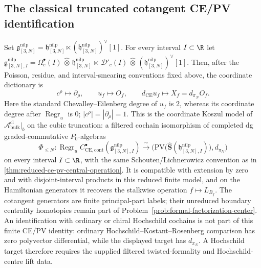 \subsection*{The classical truncated cotangent CE/PV identification}

\begin{thm}\label{thm:phi-trunc-classical}
Set
$\mathfrak g^{\mathrm{nilp}}_{[3,N]}=\mathfrak h^{\mathrm{nilp}}_{[3,N]}\ltimes
(\mathfrak h^{\mathrm{nilp}}_{[3,N]})^\vee[1]$. For every interval $I\subset\R$ let
$\mathfrak g^{\mathrm{nilp}}_{[3,N],I}=
\Omega^\bullet_c(I)\,\widehat\otimes\,\mathfrak h^{\mathrm{nilp}}_{[3,N]}\,\ltimes\,
\mathcal D'_c(I)\,\widehat\otimes\,(\mathfrak h^{\mathrm{nilp}}_{[3,N]})^\vee[1]$.
Then, after the Poisson, residue, and interval-smearing conventions fixed
above, the coordinate dictionary is
\[
  c^\rho\longmapsto\partial_\rho,
  \qquad
  u_f\longmapsto O_f,
  \qquad
  d_{\mathrm{CE}}u_f\longmapsto X_f=d_{\pi_N}O_f.
\]
Here the standard Chevalley--Eilenberg degree of \(u_f\) is \(2\),
whereas its coordinate degree after \(\operatorname{Regr}_u\) is \(0\);
\(|c^\rho|=|\partial_\rho|=1\).  This is the coordinate Koszul model of
\(\mathcal A^{\mathrm{cl}}_{\mathrm{bulk}}|_b\) on the cubic
truncation: a filtered cochain isomorphism of completed dg
graded-commutative \(P_0\)-algebras
$$\Phi_{\leq N}:
  \operatorname{Regr}_u
  C^\bullet_{\mathrm{CE},\mathrm{cont}}(\mathfrak g^{\mathrm{nilp}}_{[3,N],I})
  \xrightarrow{\ \sim\ }
  \bigl(
  \mathrm{PV}\bigl(\widehat{\mathbf S}(\mathfrak h^{\mathrm{nilp}}_{[3,N],I})\bigr),
  d_{\pi_N}\bigr)$$
on every interval \(I\subset\R\), with the same Schouten/Lichnerowicz
convention as in \ref{thm:reduced-ce-pv-central-operation}. It is
compatible with extension by zero and with disjoint-interval products in
this reduced finite model, and on the Hamiltonian generators it recovers
the stalkwise operation \(f\mapsto L_{B_f}\). The cotangent generators
are finite principal-part labels; their unreduced boundary centrality
homotopies remain part of
Problem~\ref{prob:formal-factorization-center}.  An identification with
ordinary or chiral Hochschild cochains is not part of this finite
CE/PV identity: ordinary Hochschild--Kostant--Rosenberg comparison has
zero polyvector differential, while the displayed target has
\(d_{\pi_N}\).  A Hochschild target therefore requires the supplied
filtered twisted-formality and Hochschild-centre lift data.
\end{thm}

